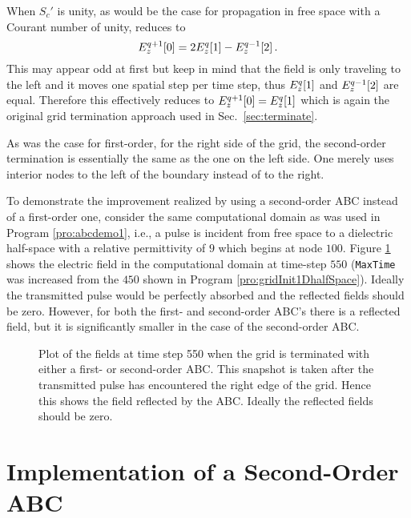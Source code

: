 When $S_c'$ is unity, as would be the case for propagation in free space
with a Courant number of unity,  reduces to
\begin{equation}
  \fdtd{E_z}{0}{q+1} = 2\fdtd{E_z}{1}{q} - \fdtd{E_z}{2}{q-1}.
\end{equation}
This may appear odd at first but keep in mind that the field is only
traveling to the left and it moves one spatial step per time step,
thus $\fdtd{E_z}{1}{q}$ and $\fdtd{E_z}{2}{q-1}$ are equal.  Therefore
this effectively reduces to $\fdtd{E_z}{0}{q+1} = \fdtd{E_z}{1}{q}$
which is again the original grid termination approach used in Sec.\
\ref{sec:terminate}.

As was the case for first-order, for the right side of the grid, the
second-order termination is essentially the same as the one on the
left side.  One merely uses interior nodes to the left of the boundary
instead of to the right.

To demonstrate the improvement realized by using a second-order ABC
instead of a first-order one, consider the same computational domain
as was used in Program \ref{pro:abcdemo1}, i.e., a pulse is
incident from free space to a dielectric half-space with a relative
permittivity of $9$ which begins at node $100$.  Figure
\ref{fig:firstSecondABC} shows the electric field in the
computational domain at time-step $550$ ({\tt MaxTime} was increased
from the $450$ shown in Program \ref{pro:gridInit1DhalfSpace}).
Ideally the transmitted pulse would be perfectly absorbed and the
reflected fields should be zero.  However, for both the first- and
second-order ABC's there is a reflected field, but it is significantly
smaller in the case of the second-order ABC.

\begin{figure}
  \begin{center}
  \end{center}
  \caption{Plot of the fields at time step 550 when the grid is
  terminated with either a first- or second-order ABC.  This snapshot
  is taken after the transmitted pulse has encountered the right edge of
  the grid.  Hence this shows the field reflected by the ABC.  Ideally the
  reflected fields should be zero.}
  \label{fig:firstSecondABC}
\end{figure}

\newpage

\section{Implementation of a Second-Order ABC
  \label{sec:secondAbc}}

